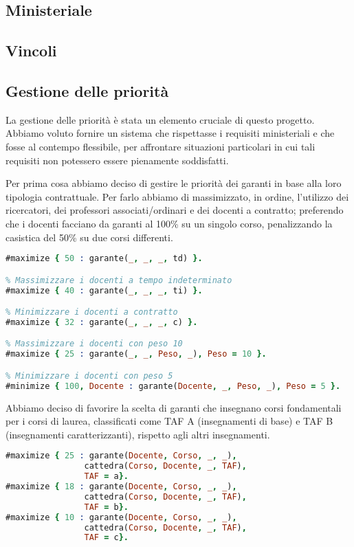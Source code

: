 \subsection{Ministeriale}\label{sec:rules-ministeriale}


\subsection{Vincoli}\label{sec:constraints}
\subsection{Gestione delle priorità}\label{sec:priorita}

La gestione delle priorità è stata un elemento cruciale di questo progetto.
Abbiamo voluto fornire un sistema che rispettasse i requisiti ministeriali e
che fosse al contempo flessibile, per affrontare situazioni particolari in cui
tali requisiti non potessero essere pienamente soddisfatti.

Per prima cosa abbiamo deciso di gestire le priorità dei garanti in base alla loro tipologia contrattuale.
Per farlo abbiamo di massimizzato, in ordine, l'utilizzo dei ricercatori, dei professori associati/ordinari e dei docenti a contratto;
preferendo che i docenti facciano da garanti al 100\% su un singolo corso, penalizzando la casistica
del 50\% su due corsi differenti.

\begin{lstlisting}[language=prolog, caption=Gestione delle priorità dei docenti]
% Massimizzare i docenti a tempo determinato (ricercatori)
#maximize { 50 : garante(_, _, _, td) }.

% Massimizzare i docenti a tempo indeterminato
#maximize { 40 : garante(_, _, _, ti) }.

% Minimizzare i docenti a contratto
#maximize { 32 : garante(_, _, _, c) }.

% Massimizzare i docenti con peso 10
#maximize { 25 : garante(_, _, Peso, _), Peso = 10 }.

% Minimizzare i docenti con peso 5
#minimize { 100, Docente : garante(Docente, _, Peso, _), Peso = 5 }.
\end{lstlisting}

Abbiamo deciso di favorire la scelta di garanti che insegnano corsi fondamentali per
i corsi di laurea, classificati come TAF A (insegnamenti di base) e TAF B
(insegnamenti caratterizzanti), rispetto agli altri insegnamenti.

\begin{lstlisting}[language=prolog, caption=TAF]
#maximize { 25 : garante(Docente, Corso, _, _), 
                cattedra(Corso, Docente, _, TAF), 
                TAF = a}.
#maximize { 18 : garante(Docente, Corso, _, _), 
                cattedra(Corso, Docente, _, TAF), 
                TAF = b}.
#maximize { 10 : garante(Docente, Corso, _, _), 
                cattedra(Corso, Docente, _, TAF), 
                TAF = c}.
\end{lstlisting}

